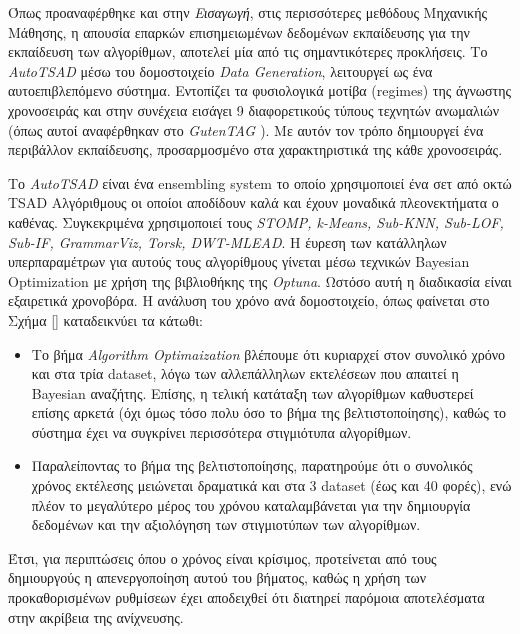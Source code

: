  Όπως προαναφέρθηκε και στην \emph{Εισαγωγή}, στις περισσότερες μεθόδους Μηχανικής Μάθησης, η απουσία επαρκών επισημειωμένων δεδομένων εκπαίδευσης για την εκπαίδευση των αλγορίθμων, αποτελεί μία από τις σημαντικότερες προκλήσεις. Το \emph{AutoTSAD} μέσω του δομοστοιχείο \emph{Data Generation}, λειτουργεί ως ένα αυτοεπιβλεπόμενο σύστημα. Εντοπίζει τα φυσιολογικά μοτίβα (regimes) της άγνωστης χρονοσειράς και στην συνέχεια εισάγει 9 διαφορετικούς τύπους τεχνητών ανωμαλιών (όπως αυτοί αναφέρθηκαν στο \emph{GutenTAG \cite{10.14778/3554821.3554873}}). Με αυτόν τον τρόπο δημιουργεί ένα περιβάλλον εκπαίδευσης, προσαρμοσμένο στα χαρακτηριστικά της κάθε χρονοσειράς.


 Το \emph{AutoTSAD} είναι ένα ensembling system το οποίο χρησιμοποιεί ένα σετ από οκτώ TSAD Αλγόριθμους οι οποίοι αποδίδουν καλά και έχουν μοναδικά πλεονεκτήματα ο καθένας. Συγκεκριμένα χρησιμοποιεί τους \emph{STOMP, k-Means, Sub-KNN, Sub-LOF, Sub-IF, GrammarViz, Torsk, DWT-MLEAD}. Η έυρεση των κατάλληλων υπερπαραμέτρων για αυτούς τους αλγορίθμους γίνεται μέσω τεχνικών Bayesian Optimization με χρήση της βιβλιοθήκης της \emph{Optuna}. Ωστόσο αυτή η διαδικασία είναι εξαιρετικά χρονοβόρα. Η ανάλυση του χρόνο ανά δομοστοιχείο, όπως φαίνεται στο Σχήμα \ref{} καταδεικνύει τα κάτωθι:
\begin{itemize}
    \item {} Το βήμα \emph{Algorithm Optimaization} βλέπουμε ότι κυριαρχεί στον συνολικό χρόνο και στα τρία dataset, λόγω των αλλεπάλληλων εκτελέσεων που απαιτεί η Bayesian αναζήτης. Επίσης, η τελική κατάταξη των αλγορίθμων καθυστερεί επίσης αρκετά (όχι όμως τόσο πολυ όσο το βήμα της βελτιστοποίησης), καθώς το σύστημα έχει να συγκρίνει περισσότερα στιγμιότυπα αλγορίθμων.
    \item {} Παραλείποντας το βήμα της βελτιστοποίησης, παρατηρούμε ότι ο συνολικός χρόνος εκτέλεσης μειώνεται δραματικά και στα 3 dataset (έως και 40 φορές), ενώ πλέον το μεγαλύτερο μέρος του χρόνου καταλαμβάνεται για την δημιουργία δεδομένων και την αξιολόγηση των στιγμιοτύπων των αλγορίθμων. 
\end{itemize}
Έτσι, για περιπτώσεις όπου ο χρόνος είναι κρίσιμος, προτείνεται από τους δημιουργούς η απενεργοποίηση αυτού του βήματος, καθώς η χρήση των προκαθορισμένων ρυθμίσεων έχει αποδειχθεί ότι διατηρεί παρόμοια αποτελέσματα στην ακρίβεια της ανίχνευσης.

